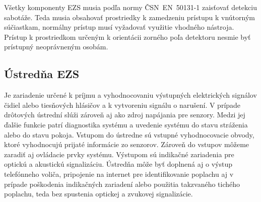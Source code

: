 Všetky komponenty EZS musia podľa normy ČSN~EN~50131-1 zaisťovať detekciu sabotáže. Teda musia obsahovať prostriedky k zamedzeniu prístupu k vnútorným súčiastkam, normálny prístup musí vyžadovať využitie vhodného nástroja. Prístup k prostriedkom určeným k orientácii zorného poľa detektoru nesmie byť prístupný neoprávneným osobám.\cite{csn-en-50131-1}

\subsection{Ústredňa EZS}

Je zariadenie určené k príjmu a vyhodnocovaniu výstupných elektrických signálov čidiel alebo tiesňových hlásičov a k vytvoreniu signálu o narušení. V prípade drôtových ústrední slúži zároveň aj ako zdroj napájania pre senzory. Medzi jej ďalšie funkcie patrí diagnostika systému a uvedenie systému do stavu stráženia alebo do stavu pokoja. Vstupom do ústredne sú vstupné vyhodnocovacie obvody, ktoré vyhodnocujú prijaté informácie zo senzorov. Zároveň do vstupov môžeme zaradiť aj ovládacie prvky systému. Výstupom sú indikačné zariadenia pre optickú a akustickú signalizáciu. Ústredňa môže byť doplnená aj o výstup telefónneho voliča, pripojenie na internet pre identifikovanie poplachu aj v prípade poškodenia indikačných zariadení alebo použitia takzvaného tichého poplachu, teda bez spustenia optickej a zvukovej signalizácie.

